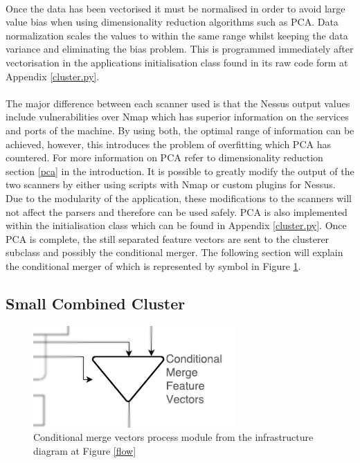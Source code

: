 \paragraph{}Once the data has been vectorised it must be normalised in order to avoid large value bias when using dimensionality reduction algorithms such as PCA. Data normalization scales the values to within the same range whilst keeping the data variance and eliminating the bias problem. This is programmed immediately after vectorisation in the applications initialisation class found in its raw code form at Appendix \ref{cluster.py}.

\paragraph{}The major difference between each scanner used is that the Nessus output values include vulnerabilities over Nmap which has superior information on the services and ports of the machine. By using both, the optimal range of information can be achieved, however, this introduces the problem of overfitting which PCA has countered. For more information on PCA refer to dimensionality reduction section \ref{pca} in the introduction. It is possible to greatly modify the output of the two scanners by either using scripts with Nmap or custom plugins for Nessus. Due to the modularity of the application, these modifications to the scanners will not affect the parsers and therefore can be used safely. PCA is also implemented within the initialisation class which can be found in Appendix \ref{cluster.py}. Once PCA is complete, the still separated feature vectors are sent to the clusterer subclass and possibly the conditional merger. The following section will explain the conditional merger of which is represented by symbol in Figure \ref{CMFV}.

\subsection{Small Combined Cluster}
\label{infra3}

\begin{figure}[!h]
\centering
\includegraphics{./Figures/CMFV.png}
\caption{Conditional merge vectors process module from the infrastructure diagram at Figure \ref{flow}}
\label{CMFV}
\end{figure}

